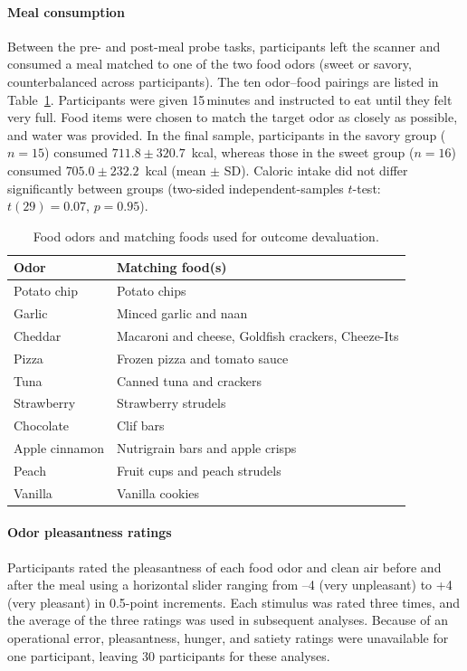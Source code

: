 \documentclass[9pt,twoside,lineno]{pnas-new}
\begin{document}
\paragraph*{Meal consumption}

Between the pre- and post-meal probe tasks, participants left the scanner and consumed a meal matched to one of the two food odors (sweet or savory, counterbalanced across participants). The ten odor--food pairings are listed in Table~\ref{tab:odor-food-mapping}. Participants were given 15\,minutes and instructed to eat until they felt very full. Food items were chosen to match the target odor as closely as possible, and water was provided. In the final sample, participants in the savory group ($n = 15$) consumed $711.8 \pm 320.7$~kcal, whereas those in the sweet group ($n = 16$) consumed $705.0 \pm 232.2$~kcal (mean $\pm$ SD). Caloric intake did not differ significantly between groups (two-sided independent-samples $t$-test: $t(29) = 0.07$, $p = 0.95$).


\begin{table}[!htbp]
\centering
\caption{Food odors and matching foods used for outcome devaluation.}
\label{tab:odor-food-mapping}
\begin{tabular}{p{}p{}}
\hline
\textbf{Odor} & \textbf{Matching food(s)} \\
\hline
Potato chip & Potato chips \\
Garlic & Minced garlic and naan \\
Cheddar & Macaroni and cheese, Goldfish crackers, Cheeze-Its \\
Pizza & Frozen pizza and tomato sauce \\
Tuna & Canned tuna and crackers \\
Strawberry & Strawberry strudels \\
Chocolate & Clif bars \\
Apple cinnamon & Nutrigrain bars and apple crisps \\
Peach & Fruit cups and peach strudels \\
Vanilla & Vanilla cookies \\
\hline
\end{tabular}
\end{table}

\paragraph*{Odor pleasantness ratings}

Participants rated the pleasantness of each food odor and clean air before and after the meal using a horizontal slider ranging from –4 (very unpleasant) to +4 (very pleasant) in 0.5-point increments. Each stimulus was rated three times, and the average of the three ratings was used in subsequent analyses. Because of an operational error, pleasantness, hunger, and satiety ratings were unavailable for one participant, leaving 30 participants for these analyses.
\end{document}
